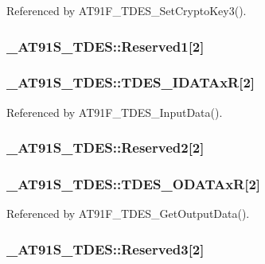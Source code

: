 Referenced by AT91F\_\-TDES\_\-SetCryptoKey3().\hypertarget{struct__AT91S__TDES_85aec13e001065b28be3851fd195ad16}{
\subsubsection{ {\bf \_\-AT91S\_\-TDES::Reserved1}\mbox{[}2\mbox{]}}}
\label{struct__AT91S__TDES_85aec13e001065b28be3851fd195ad16}


\hypertarget{struct__AT91S__TDES_de72e4becb86c352b400b17c1f3bc5d0}{
\subsubsection{ {\bf \_\-AT91S\_\-TDES::TDES\_\-IDATAxR}\mbox{[}2\mbox{]}}}
\label{struct__AT91S__TDES_de72e4becb86c352b400b17c1f3bc5d0}




Referenced by AT91F\_\-TDES\_\-InputData().\hypertarget{struct__AT91S__TDES_396ed0dc8d9bdb7a972a700acccb8601}{
\subsubsection{ {\bf \_\-AT91S\_\-TDES::Reserved2}\mbox{[}2\mbox{]}}}
\label{struct__AT91S__TDES_396ed0dc8d9bdb7a972a700acccb8601}


\hypertarget{struct__AT91S__TDES_a8ebe792fa83ac39bd60e828e305f8d4}{
\subsubsection{ {\bf \_\-AT91S\_\-TDES::TDES\_\-ODATAxR}\mbox{[}2\mbox{]}}}
\label{struct__AT91S__TDES_a8ebe792fa83ac39bd60e828e305f8d4}




Referenced by AT91F\_\-TDES\_\-GetOutputData().\hypertarget{struct__AT91S__TDES_8fd2b26af006dd7d6abcc02af8256ba0}{
\subsubsection{ {\bf \_\-AT91S\_\-TDES::Reserved3}\mbox{[}2\mbox{]}}}
\label{struct__AT91S__TDES_8fd2b26af006dd7d6abcc02af8256ba0}


